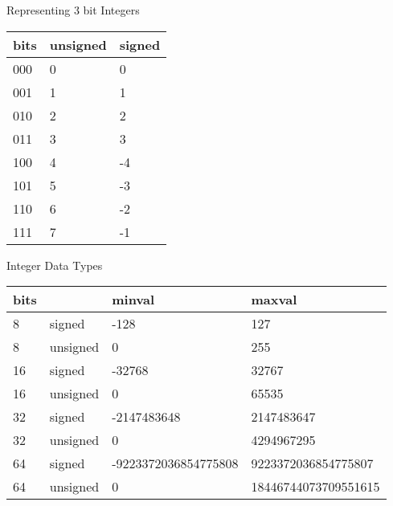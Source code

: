 \begin{withoutheadline}
\begin{frame}[fragile]{Representing 3 bit Integers}
\begin{tabular}{p{2cm}|p{2.5cm}|p{2.5cm}} \toprule    
     bits & unsigned & signed \\ \midrule
     000  &        0 &      0 \\
     001  &        1 &      1 \\
     010  &        2 &      2 \\
     011  &        3 &      3 \\
     100  &        4 &     -4 \\
     101  &        5 &     -3 \\
     110  &        6 &     -2 \\
     111  &        7 &     -1 \\ \bottomrule
\end{tabular}
\end{frame}

\begin{frame}[fragile]{Integer Data Types}
\begin{tabular}{p{1.5cm}|p{2.5cm}|p{2.5cm}|p{2.5cm}} \toprule
bits &          &               minval &               maxval \\ \midrule
8    &   signed &                 -128 &                  127 \\
8    & unsigned &                    0 &                  255 \\
16   &   signed &               -32768 &                32767 \\
16   & unsigned &                    0 &                65535 \\
32   &   signed &          -2147483648 &           2147483647 \\
32   & unsigned &                    0 &           4294967295 \\
64   &   signed & -9223372036854775808 &  9223372036854775807 \\
64   & unsigned & 0                    & 18446744073709551615 \\ \bottomrule
\end{tabular}
\end{frame}


\end{withoutheadline}
